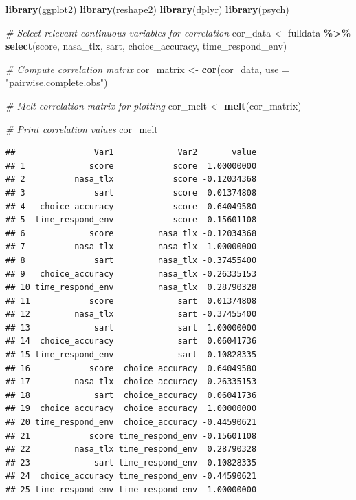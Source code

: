 \documentclass[
]{article}
\newenvironment{Shaded}{\begin{snugshade}}{\end{snugshade}}
\newcommand{\AttributeTok}[1]{\textcolor[rgb]{0.13,0.29,0.53}{#1}}
\newcommand{\CommentTok}[1]{\textcolor[rgb]{0.56,0.35,0.01}{\textit{#1}}}
\newcommand{\FunctionTok}[1]{\textcolor[rgb]{0.13,0.29,0.53}{\textbf{#1}}}
\newcommand{\NormalTok}[1]{#1}
\newcommand{\OtherTok}[1]{\textcolor[rgb]{0.56,0.35,0.01}{#1}}
\newcommand{\SpecialCharTok}[1]{\textcolor[rgb]{0.81,0.36,0.00}{\textbf{#1}}}
\newcommand{\StringTok}[1]{\textcolor[rgb]{0.31,0.60,0.02}{#1}}
\begin{document}
\begin{Shaded}
\begin{Highlighting}[]
\FunctionTok{library}\NormalTok{(ggplot2)}
\FunctionTok{library}\NormalTok{(reshape2)}
\FunctionTok{library}\NormalTok{(dplyr)}
\FunctionTok{library}\NormalTok{(psych)}

\CommentTok{\# Select relevant continuous variables for correlation}
\NormalTok{cor\_data }\OtherTok{\textless{}{-}}\NormalTok{ fulldata }\SpecialCharTok{\%\textgreater{}\%}
  \FunctionTok{select}\NormalTok{(score, nasa\_tlx, sart, choice\_accuracy, time\_respond\_env)}

\CommentTok{\# Compute correlation matrix}
\NormalTok{cor\_matrix }\OtherTok{\textless{}{-}} \FunctionTok{cor}\NormalTok{(cor\_data, }\AttributeTok{use =} \StringTok{"pairwise.complete.obs"}\NormalTok{)}

\CommentTok{\# Melt correlation matrix for plotting}
\NormalTok{cor\_melt }\OtherTok{\textless{}{-}} \FunctionTok{melt}\NormalTok{(cor\_matrix)}

\CommentTok{\# Print correlation values}
\NormalTok{cor\_melt}
\end{Highlighting}
\end{Shaded}

\begin{verbatim}
##                Var1             Var2       value
## 1             score            score  1.00000000
## 2          nasa_tlx            score -0.12034368
## 3              sart            score  0.01374808
## 4   choice_accuracy            score  0.64049580
## 5  time_respond_env            score -0.15601108
## 6             score         nasa_tlx -0.12034368
## 7          nasa_tlx         nasa_tlx  1.00000000
## 8              sart         nasa_tlx -0.37455400
## 9   choice_accuracy         nasa_tlx -0.26335153
## 10 time_respond_env         nasa_tlx  0.28790328
## 11            score             sart  0.01374808
## 12         nasa_tlx             sart -0.37455400
## 13             sart             sart  1.00000000
## 14  choice_accuracy             sart  0.06041736
## 15 time_respond_env             sart -0.10828335
## 16            score  choice_accuracy  0.64049580
## 17         nasa_tlx  choice_accuracy -0.26335153
## 18             sart  choice_accuracy  0.06041736
## 19  choice_accuracy  choice_accuracy  1.00000000
## 20 time_respond_env  choice_accuracy -0.44590621
## 21            score time_respond_env -0.15601108
## 22         nasa_tlx time_respond_env  0.28790328
## 23             sart time_respond_env -0.10828335
## 24  choice_accuracy time_respond_env -0.44590621
## 25 time_respond_env time_respond_env  1.00000000
\end{verbatim}
\end{document}

